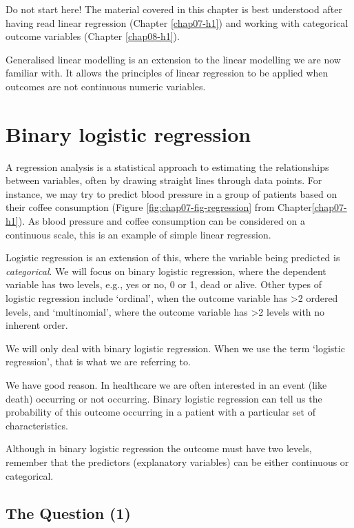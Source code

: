 \documentclass[
  12pt,
  krantz2]{krantz}
\begin{document}
Do not start here!
The material covered in this chapter is best understood after having read linear regression (Chapter \ref{chap07-h1}) and working with categorical outcome variables (Chapter \ref{chap08-h1}).

Generalised linear modelling is an extension to the linear modelling we are now familiar with.
It allows the principles of linear regression to be applied when outcomes are not continuous numeric variables.

\hypertarget{binary-logistic-regression}{%
\section{Binary logistic regression}\label{binary-logistic-regression}}


A regression analysis is a statistical approach to estimating the relationships between variables, often by drawing straight lines through data points.
For instance, we may try to predict blood pressure in a group of patients based on their coffee consumption (Figure \ref{fig:chap07-fig-regression} from Chapter\ref{chap07-h1}).
As blood pressure and coffee consumption can be considered on a continuous scale, this is an example of simple linear regression.

Logistic regression is an extension of this, where the variable being predicted is \emph{categorical}.
We will focus on binary logistic regression, where the dependent variable has two levels, e.g., yes or no, 0 or 1, dead or alive.
Other types of logistic regression include `ordinal', when the outcome variable has \textgreater2 ordered levels, and `multinomial', where the outcome variable has \textgreater2 levels with no inherent order.

We will only deal with binary logistic regression.
When we use the term `logistic regression', that is what we are referring to.

We have good reason.
In healthcare we are often interested in an event (like death) occurring or not occurring.
Binary logistic regression can tell us the probability of this outcome occurring in a patient with a particular set of characteristics.

Although in binary logistic regression the outcome must have two levels, remember that the predictors (explanatory variables) can be either continuous or categorical.

\hypertarget{the-question-1-1}{%
\subsection{The Question (1)}\label{the-question-1-1}}
\end{document}
